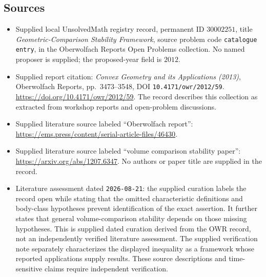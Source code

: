 \documentclass[11pt]{article}
\begin{document}
\subsection{Sources}
\begin{itemize}
\item Supplied local UnsolvedMath registry record, permanent ID \(30002251\), title \emph{Geometric-Comparison Stability Framework}, source problem code \texttt{catalogue entry}, in the Oberwolfach Reports Open Problems collection. No named proposer is supplied; the proposed-year field is \(2012\).
\item Supplied report citation: \emph{Convex Geometry and its Applications (2013)}, Oberwolfach Reports, pp.~3473--3548, DOI \texttt{10.4171/owr/2012/59}. \url{https://doi.org/10.4171/owr/2012/59}. The record describes this collection as extracted from workshop reports and open-problem discussions.
\item Supplied literature source labeled ``Oberwolfach report'': \url{https://ems.press/content/serial-article-files/46430}.
\item Supplied literature source labeled ``volume comparison stability paper'': \url{https://arxiv.org/abs/1207.6347}. No authors or paper title are supplied in the record.
\item Literature assessment dated \texttt{2026-08-21}: the supplied curation labels the record open while stating that the omitted characteristic definitions and body-class hypotheses prevent identification of the exact assertion. It further states that general volume-comparison stability depends on those missing hypotheses. This is supplied dated curation derived from the OWR record, not an independently verified literature assessment. The supplied verification note separately characterizes the displayed inequality as a framework whose reported applications supply results. These source descriptions and time-sensitive claims require independent verification.
\end{itemize}
\end{document}

